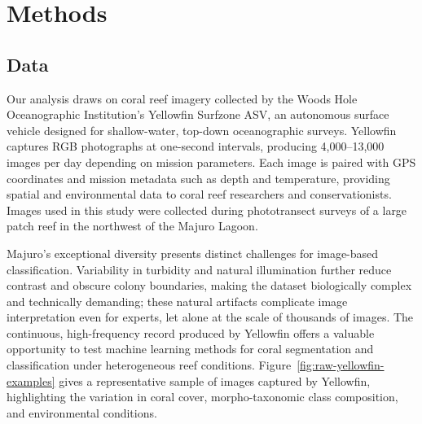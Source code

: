 \documentclass[11pt]{elsarticle}
\begin{document}
\section{Methods}
\subsection{Data}

Our analysis draws on coral reef imagery collected by the Woods Hole Oceanographic Institution's Yellowfin Surfzone ASV, an autonomous surface vehicle designed for shallow-water, top-down oceanographic surveys. Yellowfin captures RGB photographs at one-second intervals, producing 4,000--13,000 images per day depending on mission parameters. Each image is paired with GPS coordinates and mission metadata such as depth and temperature, providing spatial and environmental data to coral reef researchers and conservationists. Images used in this study were collected during phototransect surveys of a large patch reef in the northwest of the Majuro Lagoon.

Majuro's exceptional diversity presents distinct challenges for image-based classification. Variability in turbidity and natural illumination further reduce contrast and obscure colony boundaries, making the dataset biologically complex and technically demanding; these natural artifacts complicate image interpretation even for experts, let alone at the scale of thousands of images. The continuous, high-frequency record produced by Yellowfin offers a valuable opportunity to test machine learning methods for coral segmentation and classification under heterogeneous reef conditions. Figure~\ref{fig:raw-yellowfin-examples} gives a representative sample of images captured by Yellowfin, highlighting the variation in coral cover, morpho-taxonomic class composition, and environmental conditions.
\end{document}

